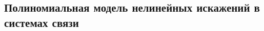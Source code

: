 %
%

\subsection{Полиномиальная модель нелинейных искажений в системах связи} \label{subsec:polynom_descript}

